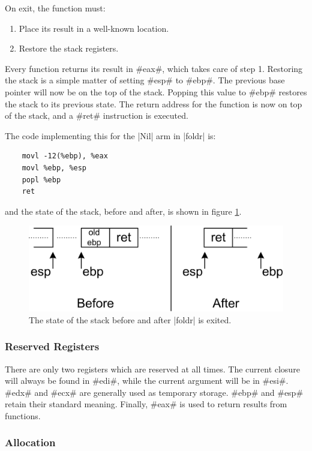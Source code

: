 \documentclass[11pt]{article}
\begin{document}
On exit, the function must:

\begin{enumerate}
\item Place its result in a well-known location.
\item Restore the stack registers.
\end{enumerate}

\noindent
Every function returns its result in #eax#, which takes care of step
1. Restoring the stack is a simple matter of setting #esp# to
#ebp#. The previous base pointer will now be on the top of the
stack. Popping this value to #ebp# restores the stack to its previous
state. The return address for the function is now on top of the stack,
and a #ret# instruction is executed.

The code implementing this for the |Nil| arm in |foldr| is:

\begin{verbatim}
    movl -12(%ebp), %eax
    movl %ebp, %esp
    popl %ebp
    ret
\end{verbatim}

\noindent
and the state of the stack, before and after, is shown in figure \ref{fig_exit}.

\begin{figure}\centering
\includegraphics{fig_exit}
\caption{The state of the stack before and after 
|foldr| is exited.}
\label{fig_exit}
\end{figure}

\subsubsection{Reserved Registers}

There are only two registers which are reserved at all times. The
current closure will always be found in #edi#, while the current
argument will be in #esi#. #edx# and #ecx# are generally used as
temporary storage. #ebp# and #esp# retain their standard
meaning. Finally, #eax# is used to return results from functions.

\subsubsection{Allocation}
\end{document}

